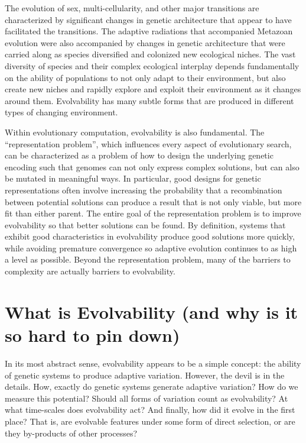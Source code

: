 \documentclass[PhD]{msu-thesis}
\begin{document}
The evolution of sex, multi-cellularity, and other major transitions are characterized by significant changes in genetic architecture that appear to have facilitated the transitions\cite{smith_major_1995}. The adaptive radiations that accompanied Metazoan evolution were also accompanied by changes in genetic architecture that were carried along as species diversified and colonized new ecological niches\cite{kirschner_evolvability_1998}. %
The vast diversity of species and their complex ecological interplay depends fundamentally on the ability of populations to not only adapt to their environment, but also create new niches and rapidly explore and exploit their environment as it changes around them. 
Evolvability has many subtle forms that are produced in different types of changing environment.

Within evolutionary computation, evolvability is also fundamental. The ``representation problem'', which influences every aspect of evolutionary search, can be characterized as a problem of how to design the underlying genetic encoding such that genomes can not only express complex solutions, but can also be mutated in meaningful ways\cite{dawkins_13_2003}. In particular, good designs for genetic representations often involve increasing the probability that a recombination between potential solutions can produce a result that is not only viable, but more fit than either parent. The entire goal of the representation problem is to improve evolvability so that better solutions can be found. By definition, systems that exhibit good characteristics in evolvability produce good solutions more quickly, while avoiding premature convergence\cite{altenberg_evolution_1994} so adaptive evolution continues to as high a level as possible. Beyond the representation problem, many of the barriers to complexity are actually barriers to evolvability.

\section{What is Evolvability (and why is it so hard to pin down)}
In its most abstract sense, evolvability appears to be a simple concept: the ability of genetic systems to produce adaptive variation. However, the devil is in the details. How, exactly do genetic systems generate adaptive variation? How do we measure this potential? Should all forms of variation count as evolvability? At what time-scales does evolvability act? And finally, how did it evolve in the first place? That is, are evolvable features under some form of direct selection, or are they by-products of other processes?
\end{document}
